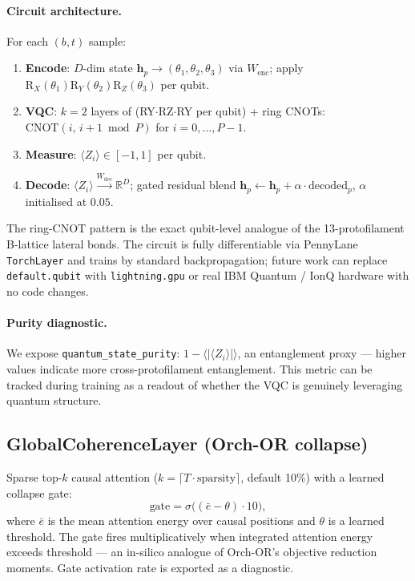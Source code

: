 \documentclass[11pt]{article}
\theoremstyle{definition}
\newcommand{\RR}{\mathbb{R}}
\newcommand{\vh}{\mathbf{h}}
\newcommand{\sigmoid}{\sigma}
\begin{document}
\paragraph{Circuit architecture.}
For each $(b, t)$ sample:
\begin{enumerate}[noitemsep]
  \item \textbf{Encode}: $D$-dim state $\vh_p \to (\theta_1, \theta_2, \theta_3)$ via $W_\text{enc}$; apply $\mathrm{R}_X(\theta_1)\mathrm{R}_Y(\theta_2)\mathrm{R}_Z(\theta_3)$ per qubit.
  \item \textbf{VQC}: $k=2$ layers of (RY$\cdot$RZ$\cdot$RY per qubit) + ring CNOTs: $\mathrm{CNOT}(i,\,i+1\bmod P)$ for $i=0,\ldots,P-1$.
  \item \textbf{Measure}: $\langle Z_i\rangle\in[-1,1]$ per qubit.
  \item \textbf{Decode}: $\langle Z_i\rangle \xrightarrow{W_\text{dec}} \RR^D$; gated residual blend $\vh_p \leftarrow \vh_p + \alpha\cdot\text{decoded}_p$, $\alpha$ initialised at $0.05$.
\end{enumerate}
The ring-CNOT pattern is the exact qubit-level analogue of the 13-protofilament B-lattice lateral bonds. The circuit is fully differentiable via PennyLane \texttt{TorchLayer} \citep{bergholm2018pennylane} and trains by standard backpropagation; future work can replace \texttt{default.qubit} with \texttt{lightning.gpu} or real IBM Quantum / IonQ hardware with no code changes.

\paragraph{Purity diagnostic.}
We expose \texttt{quantum\_state\_purity}: $1 - \langle|\langle Z_i\rangle|\rangle$, an entanglement proxy — higher values indicate more cross-protofilament entanglement. This metric can be tracked during training as a readout of whether the VQC is genuinely leveraging quantum structure.

\subsection{GlobalCoherenceLayer (Orch-OR collapse)}
\label{sec:coherence}

Sparse top-$k$ causal attention ($k=\lceil T\cdot\text{sparsity}\rceil$, default 10\%) with a learned collapse gate:
\begin{equation}
  \text{gate} = \sigmoid\!\bigl((\bar{e}-\theta)\cdot 10\bigr),
\end{equation}
where $\bar{e}$ is the mean attention energy over causal positions and $\theta$ is a learned threshold. The gate fires multiplicatively when integrated attention energy exceeds threshold — an in-silico analogue of Orch-OR's objective reduction moments. Gate activation rate is exported as a diagnostic.
\end{document}
